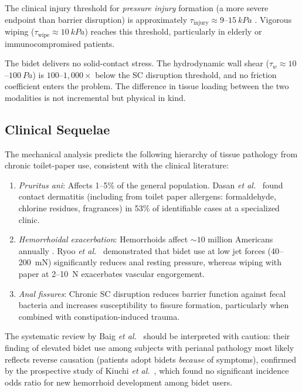 \documentclass[aps,prfluids,reprint,amsmath,amssymb,floatfix]{revtex4-2}
\begin{document}
The clinical injury threshold for \emph{pressure injury} formation (a more
severe endpoint than barrier disruption) is approximately
$\tau_\mathrm{injury} \approx 9$--$\SI{15}{kPa}$ \citep{Broderick2021}.
Vigorous wiping ($\tau_\mathrm{wipe} \approx \SI{10}{kPa}$) reaches this
threshold, particularly in elderly or immunocompromised patients.

The bidet delivers no solid-contact stress. The hydrodynamic wall shear
($\tau_w \approx 10$--$\SI{100}{Pa}$) is $100$--$1{,}000\times$ below the
SC disruption threshold, and no friction coefficient enters the problem.
The difference in tissue loading between the two modalities is not
incremental but physical in kind.

\subsection{Clinical Sequelae}
\label{subsec:clinical}

The mechanical analysis predicts the following hierarchy of tissue pathology
from chronic toilet-paper use, consistent with the clinical literature:

\begin{enumerate}[leftmargin=*]
    \item \emph{Pruritus ani}: Affects 1--5\% of the general population.
    Dasan \textit{et al.}\ \citep{Dasan1999} found contact dermatitis (including
    from toilet paper allergens: formaldehyde, chlorine residues, fragrances)
    in 53\% of identifiable cases at a specialized clinic.
    \item \emph{Hemorrhoidal exacerbation}: Hemorrhoids affect $\sim10$ million
    Americans annually \citep{Peery2014}. Ryoo \textit{et al.}\ \citep{Ryoo2011}
    demonstrated that bidet use at low jet forces (40--\SI{200}{mN}) significantly
    reduces anal resting pressure, whereas wiping with paper at 2--\SI{10}{N}
    exacerbates vascular engorgement.
    \item \emph{Anal fissures}: Chronic SC disruption reduces barrier function
    against fecal bacteria and increases susceptibility to fissure formation,
    particularly when combined with constipation-induced trauma.
\end{enumerate}

The systematic review by Baig \textit{et al.}\ \citep{Baig2022} should be
interpreted with caution: their finding of elevated bidet use among subjects
with perianal pathology most likely reflects reverse causation (patients adopt
bidets \emph{because} of symptoms), confirmed by the prospective study of
Kiuchi \textit{et al.}\ \citep{Kiuchi2017}, which found no significant incidence
odds ratio for new hemorrhoid development among bidet users.
\end{document}
